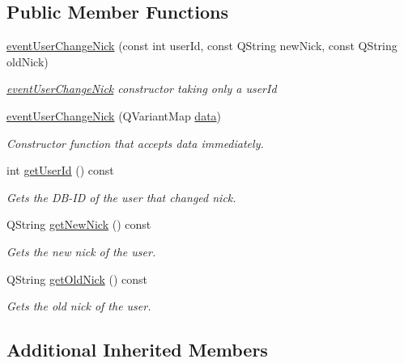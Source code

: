 \subsection*{Public Member Functions}
\begin{DoxyCompactItemize}
\item 
\hyperlink{classshared_1_1events_1_1event_user_change_nick_af8377a977c01b8247ab744a190fe9a6b}{event\-User\-Change\-Nick} (const int user\-Id, const Q\-String new\-Nick, const Q\-String old\-Nick)
\begin{DoxyCompactList}\small\item\em \hyperlink{classshared_1_1events_1_1event_user_change_nick}{event\-User\-Change\-Nick} constructor taking only a user\-Id \end{DoxyCompactList}\item 
\hyperlink{classshared_1_1events_1_1event_user_change_nick_a1aaf1820a5204385f6be44bea5fb02be}{event\-User\-Change\-Nick} (Q\-Variant\-Map \hyperlink{classshared_1_1events_1_1cls_event_a6cfb6b96d72fc1e7a101e61061ec2755}{data})
\begin{DoxyCompactList}\small\item\em Constructor function that accepts data immediately. \end{DoxyCompactList}\item 
int \hyperlink{classshared_1_1events_1_1event_user_change_nick_ad79adbb7cd52aa5307ff59ddbc2d8b7d}{get\-User\-Id} () const 
\begin{DoxyCompactList}\small\item\em Gets the D\-B-\/\-I\-D of the user that changed nick. \end{DoxyCompactList}\item 
Q\-String \hyperlink{classshared_1_1events_1_1event_user_change_nick_a69ac7b5a6aa9bfab4d28e9fe54baf3d5}{get\-New\-Nick} () const 
\begin{DoxyCompactList}\small\item\em Gets the new nick of the user. \end{DoxyCompactList}\item 
Q\-String \hyperlink{classshared_1_1events_1_1event_user_change_nick_a4eab71d2abb978c22f7207a46a9bc70e}{get\-Old\-Nick} () const 
\begin{DoxyCompactList}\small\item\em Gets the old nick of the user. \end{DoxyCompactList}\end{DoxyCompactItemize}
\subsection*{Additional Inherited Members}



